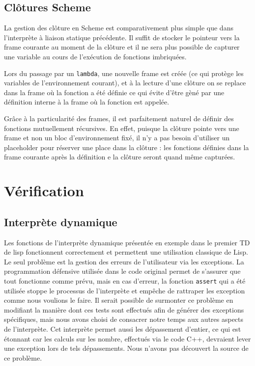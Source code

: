 \documentclass[a4paper,11pt]{article}
\begin{document}
\subsection{Clôtures Scheme}

La gestion des clôture en Scheme est comparativement plus simple que dans
l'interprète à liaison statique précédente. Il suffit de stocker le pointeur
vers la frame courante au moment de la clôture et il ne sera plus possible de
capturer une variable au cours de l'exécution de fonctions imbriquées.

Lors du passage par un \texttt{lambda}, une nouvelle frame est créée (ce qui
protège les variables de l'environnement courant), et à la lecture d'une clôture
on se replace dans la frame où la fonction a été définie ce qui évite d'être
gèné par une définition interne à la frame où la fonction est appelée.

Grâce à la particularité des frames, il est parfaitement naturel de définir des
fonctions mutuellement récursives. En effet, puisque la clôture pointe vers une
frame et non un bloc d'environnement fixé, il n'y a pas besoin d'utiliser un
placeholder pour réserver une place dans la clôture : les fonctions définies
dans la frame courante après la définition e la clôture seront quand même
capturées.

\section{Vérification}
 
 \subsection{Interprète dynamique}

 Les fonctions de l'interprète dynamique présentée en exemple dans le premier TD
 de lisp fonctionnent correctement et permettent 
 une utilisation classique de Lisp.  
 Le seul problème est la gestion des erreurs de 
 l'utilisateur via les exceptions. La programmation défensive utilisée dans le 
 code original permet de s'assurer que tout fonctionne comme prévu, mais en cas 
 d'erreur, la fonction \texttt{assert} qui a été utilisée stoppe le processus de 
 l'interprète et empêche de rattraper les exception comme nous voulions le faire.
 Il serait possible de surmonter ce problème en modifiant la manière dont ces 
 tests sont effectués afin de générer des exceptions spécifiques, mais nous avons 
 choisi de consacrer notre temps aux autres aspects de l'interprète.
 Cet interprète permet aussi les dépassement d'entier, ce qui est étonnant car 
 les calculs sur les nombre, effectués via le code C++, devraient lever une 
 exception lors de tels dépassements. Nous n'avons pas découvert la source de 
 ce problème.
 
\end{document}
